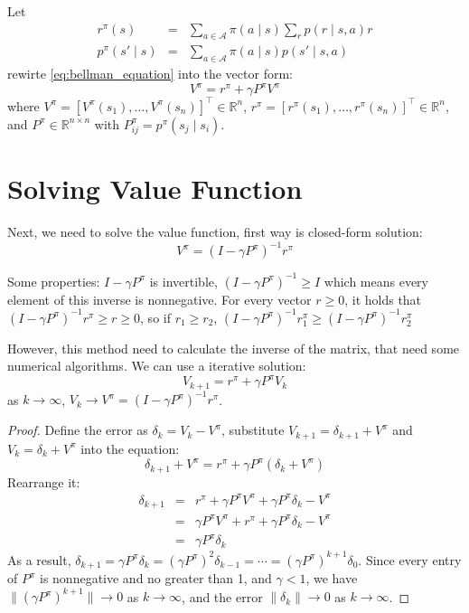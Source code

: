 \documentclass[10pt]{elegantbook}
\begin{document}
Let 
\begin{equation} \label{eq:bellman_equation_vector}
    \begin{array}{rll}
        r^{\pi}(s) &=& \sum_{a \in \mathcal A} \pi(a \mid s) \sum_r p(r \mid s, a) r \\
        p^{\pi}(s' \mid s) &=& \sum_{a \in \mathcal A} \pi(a \mid s) p(s' \mid s, a)
    \end{array}
\end{equation}
rewirte \ref{eq:bellman_equation} into the vector form:
\begin{equation}
    V^{\pi} = r^{\pi} + \gamma P^{\pi} V^{\pi}
\end{equation}
where $V^{\pi} = [V^{\pi}(s_1), \ldots, V^{\pi}(s_n)]^{\top} \in \mathbb R^n$, $r^{\pi} = [r^{\pi}(s_1), \ldots, r^{\pi}(s_n)]^{\top} \in \mathbb R^n$, and 
$P^{\pi} \in \mathbb R^{n \times n}$ with $P^{\pi}_{ij} = p^{\pi}(s_j \mid s_i)$.

\section{Solving Value Function} \label{sec:solving_value_function}
Next, we need to solve the value function, first way is closed-form solution:
\[ V^{\pi} = \left ( I - \gamma P^{\pi} \right )^{-1} r^{\pi} \]

Some properties: $I - \gamma P^{\pi}$ is invertible, $\left ( I - \gamma P^{\pi} \right )^{-1} \geq I$ which means every element of this inverse is nonnegative.
For every vector $r \geq 0$, it holds that $\left ( I - \gamma P^{\pi} \right )^{-1} r^{\pi} \geq r \geq 0$, so if $r_1 \geq r_2$, $\left ( I - \gamma P^{\pi} \right )^{-1} r_1^{\pi} \geq
\left ( I - \gamma P^{\pi} \right )^{-1} r_2^{\pi}$

However, this method need to calculate the inverse of the matrix, that need some numerical algorithms. We can 
use a iterative solution:
\[ V_{k+1} = r^{\pi} + \gamma P^{\pi}V_k \]
as $k \rightarrow \infty$, $V_k \rightarrow V^{\pi} = \left ( I - \gamma P^{\pi} \right )^{-1} r^{\pi}$.

\begin{proof}
    Define the error as $\delta_k = V_k - V^{\pi}$, substitute $V_{k+1} = \delta_{k+1} + V^{\pi}$ and $V_k = \delta_k + V^{\pi}$ into the equation:
    \[ \delta_{k+1} + V^{\pi} = r^{\pi} + \gamma P^{\pi}(\delta_k + V^{\pi}) \]
    Rearrange it:
    \[ 
    \begin{array}{lll}
        \delta_{k+1} &=& r^{\pi} + \gamma P^{\pi}V^{\pi} + \gamma P^{\pi}\delta_k - V^{\pi} \\
        &=& \gamma P^{\pi}V^{\pi} + r^{\pi} + \gamma P^{\pi}\delta_k - V^{\pi} \\
        &=& \gamma P^{\pi}\delta_k
    \end{array}
    \]
    As a result, $\delta_{k+1} = \gamma P^{\pi} \delta_k = (\gamma P^{\pi})^2 \delta_{k-1} = \cdots = (\gamma P^{\pi})^{k+1} \delta_0$.
    Since every entry of $P^{\pi}$ is nonnegative and no greater than 1, and $\gamma < 1$, we have $\|(\gamma P^{\pi})^{k+1}\| \rightarrow 0$ as $k \rightarrow \infty$,
    and the error $\|\delta_k\| \rightarrow 0$ as $k \rightarrow \infty$.
\end{proof}
\end{document}
